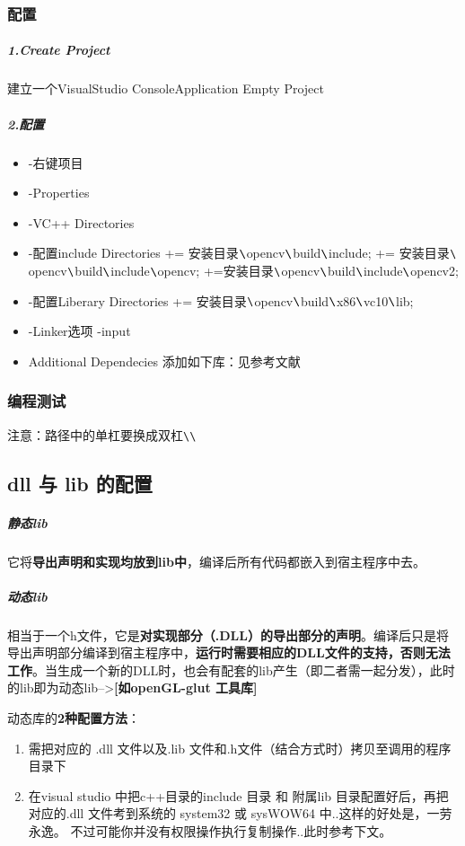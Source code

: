 \documentclass[UTF8,a4paper,12pt]{ctexbook} %
\begin{document}
			\subsubsection{配置}
				\subparagraph{1.Create Project}建立一个VisualStudio  ConsoleApplication Empty Project
				\subparagraph{2.配置}
				\begin{itemize}[itemindent = 2em]
					\item -右键项目
					\item -Properties
					\item -VC++ Directories
					\item -配置include Directories += 安装目录$ \verb|\|$opencv$ \verb|\|$build$ \verb|\|$include; += 安装目录$ \verb|\|$ opencv$ \verb|\|$build$ \verb|\|$include$ \verb|\|$opencv; +=安装目录$ \verb|\|$opencv$ \verb|\|$build$ \verb|\|$include$ \verb|\|$opencv2;
					\item -配置Liberary Directories += 安装目录$ \verb|\|$opencv$ \verb|\|$build$ \verb|\|$x86$ \verb|\|$vc10$ \verb|\|$lib;
					\item -Linker选项 -input
					\item Additional Dependecies 添加如下库：见参考文献
				\end{itemize}
			
			\subsubsection{编程测试}注意：路径中的单杠要换成双杠\verb|\\|
			
		\subsection{dll 与 lib 的配置}
			\subparagraph{静态lib}它将\textbf{导出声明和实现均放到lib中}，编译后所有代码都嵌入到宿主程序中去。
			\subparagraph{动态lib}相当于一个h文件，它是\textbf{对实现部分（.DLL）的导出部分的声明}。编译后只是将导出声明部分编译到宿主程序中，\textbf{运行时需要相应的DLL文件的支持，否则无法工作}。当生成一个新的DLL时，也会有配套的lib产生（即二者需一起分发），此时的lib即为动态lib-->\textbf{[如openGL-glut 工具库]}
			
			动态库的\textbf{2种配置方法}：
				\begin{enumerate}[itemindent = 2em]
					\item 需把对应的 .dll 文件以及.lib 文件和.h文件（结合方式时）拷贝至调用的程序目录下
					\item 在visual studio 中把c++目录的include 目录 和 附属lib 目录配置好后，再把对应的.dll 文件考到系统的 system32 或 sysWOW64 中..这样的好处是，一劳永逸。 不过可能你并没有权限操作执行复制操作..此时参考下文。
				\end{enumerate}
		
\end{document}
